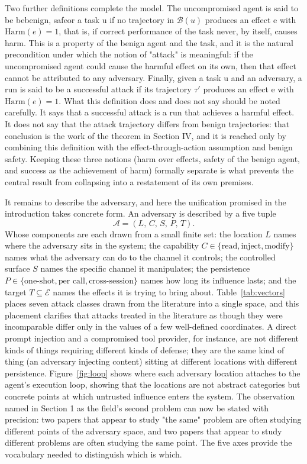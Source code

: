 \documentclass[journal]{IEEEtran}
\theoremstyle{remark}
\begin{document}
Two further definitions complete the model. The uncompromised agent is said to be bebenign, safeor a task u if no trajectory in $\mathcal{B}(u)$ produces an effect e with $\mathrm{Harm}(e)=1$, that is, if correct performance of the task never, by itself, causes harm. This is a property of the benign agent and the task, and it is the natural precondition under which the notion of "attack" is meaningful: if the uncompromised agent could cause the harmful effect on its own, then that effect cannot be attributed to any adversary. Finally, given a task u and an adversary, a run is said to be a successful attack if its trajectory $\tau'$ produces an effect e with $\mathrm{Harm}(e)=1$. What this definition does and does not say should be noted carefully. It says that a successful attack is a run that achieves a harmful effect. It does not say that the attack trajectory differs from benign trajectories: that conclusion is the work of the theorem in Section IV, and it is reached only by combining this definition with the effect-through-action assumption and benign safety. Keeping these three notions (harm over effects, safety of the benign agent, and success as the achievement of harm) formally separate is what prevents the central result from collapsing into a restatement of its own premises.

It remains to describe the adversary, and here the unification promised in the introduction takes concrete form. An adversary is described by a five tuple
\[
\mathcal{A} = (L,\, C,\, S,\, P,\, T).
\]
Whose components are each drawn from a small finite set: the location $L$ names where the adversary sits in the system; the capability $C\in\{\text{read},\text{inject},\text{modify}\}$ names what the adversary can do to the channel it controls; the controlled surface $S$ names the specific channel it manipulates; the persistence $P\in\{\text{one-shot},\text{per call},\text{cross-session}\}$ names how long its influence lasts; and the target $T\subseteq\mathcal{E}$ names the effects it is trying to bring about. Table~\ref{tab:vectors} places seven attack classes drawn from the literature into a single space, and this placement clarifies that attacks treated in the literature as though they were incomparable differ only in the values of a few well-defined coordinates. A direct prompt injection and a compromised tool provider, for instance, are not different kinds of things requiring different kinds of defense; they are the same kind of thing (an adversary injecting content) sitting at different locations with different persistence. Figure~\ref{fig:loop} shows where each adversary location attaches to the agent's execution loop, showing that the locations are not abstract categories but concrete points at which untrusted influence enters the system. The observation named in Section 1 as the field's second problem can now be stated with precision: two papers that appear to study "the same" problem are often studying different points of the adversary space, and two papers that appear to study different problems are often studying the same point. The five axes provide the vocabulary needed to distinguish which is which.
\end{document}
